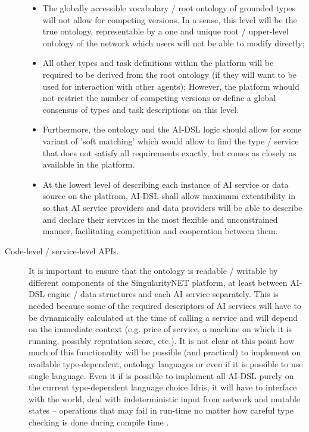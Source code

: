 \documentclass[]{report}
\begin{document}
\begin{description}
  \begin{itemize}
    \item The globally accessible vocabulary / root ontology of grounded types will not allow for competing versions. In a sense, this level will be the true ontology, representable by a one and unique root / upper-level ontology of the network which users will not be able to modify directly;
    \item All other types and task definitions within the platform will be required to be derived from the root ontology (if they will want to be used for interaction with other agents); However, the platform whould not restrict the number of competing versions or define a global consensus  of types and task descriptions on this level.
    \item Furthermore, the ontology and the AI-DSL logic should allow for some variant of 'soft matching' which would allow to find the type / service that does not satisfy all requirements exactly, but comes as closely as available in the platform.
    \item At the lowest level of describing each instance of AI service or data source on the platfrom, AI-DSL shall allow maximum extentibility in so that AI service providers and data providers will be able to describe and declare their services in the most flexible and unconstrained manner, facilitating competition and cooperation between them.
  \end{itemize}

  \item[Code-level / service-level APIs.] It is important to ensure that the ontology is readable / writable by different components of the SingularityNET platform, at least between AI-DSL engine / data structures and each AI service separately. This is needed because some of the required descriptors of AI services will have to be dynamically calculated at the time of calling a service and will depend on the immediate context (e.g. price of service, a machine on which it is running, possibly reputation score, etc.). It is not clear at this point how much of this functionality will be possible (and practical) to implement on available type-dependent, ontology languages or even if it is possible to use single language. Even it if is possible to implement all AI-DSL purely on the current type-dependent language choice Idris, it will have to interface with the world, deal with indeterministic input from network and mutable states -- operations that may fail in run-time no matter how careful type checking is done during compile time \cite{brady_resource-dependent_2015}.


\end{description}
\end{document}
